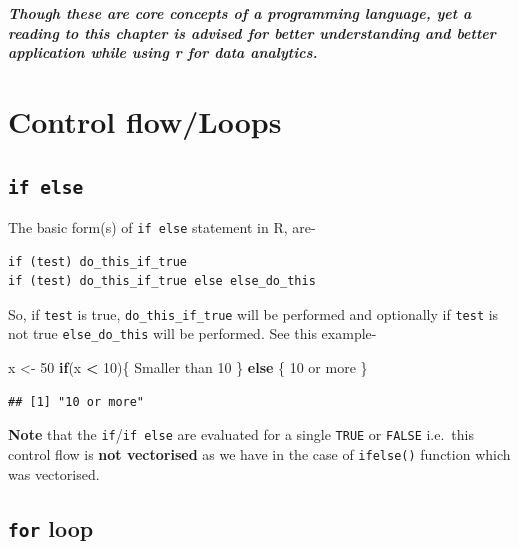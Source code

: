 \documentclass[
]{book}
\newenvironment{Shaded}{\begin{snugshade}}{\end{snugshade}}
\newcommand{\ControlFlowTok}[1]{\textcolor[rgb]{0.13,0.29,0.53}{\textbf{#1}}}
\newcommand{\DecValTok}[1]{\textcolor[rgb]{0.00,0.00,0.81}{#1}}
\newcommand{\NormalTok}[1]{#1}
\newcommand{\OtherTok}[1]{\textcolor[rgb]{0.56,0.35,0.01}{#1}}
\newcommand{\SpecialCharTok}[1]{\textcolor[rgb]{0.81,0.36,0.00}{\textbf{#1}}}
\newcommand{\StringTok}[1]{\textcolor[rgb]{0.31,0.60,0.02}{#1}}
\begin{document}
\textbf{\emph{Though these are core concepts of a programming language, yet a reading to this chapter is advised for better understanding and better application while using r for data analytics.}}

\hypertarget{control-flowloops}{%
\section{Control flow/Loops}\label{control-flowloops}}

\hypertarget{if-else}{%
\subsection*{\texorpdfstring{\texttt{if\ else}}{if else}}\label{if-else}}

The basic form(s) of \texttt{if\ else} statement in R, are-

\begin{verbatim}
if (test) do_this_if_true
if (test) do_this_if_true else else_do_this
\end{verbatim}

So, if \texttt{test} is true, \texttt{do\_this\_if\_true} will be performed and optionally if \texttt{test} is not true \texttt{else\_do\_this} will be performed. See this example-

\begin{Shaded}
\begin{Highlighting}[]
\NormalTok{x }\OtherTok{\textless{}{-}} \DecValTok{50}
\ControlFlowTok{if}\NormalTok{(x }\SpecialCharTok{\textless{}} \DecValTok{10}\NormalTok{)\{}
  \StringTok{\textquotesingle{}Smaller than 10\textquotesingle{}}
\NormalTok{\} }\ControlFlowTok{else}\NormalTok{ \{}
  \StringTok{\textquotesingle{}10 or more\textquotesingle{}}
\NormalTok{\}}
\end{Highlighting}
\end{Shaded}

\begin{verbatim}
## [1] "10 or more"
\end{verbatim}

\textbf{Note} that the \texttt{if}/\texttt{if\ else} are evaluated for a single \texttt{TRUE} or \texttt{FALSE} i.e.~this control flow is \textbf{not vectorised} as we have in the case of \texttt{ifelse()} function which was vectorised.

\hypertarget{for-loop}{%
\subsection*{\texorpdfstring{\texttt{for} loop}{for loop}}\label{for-loop}}
\end{document}
